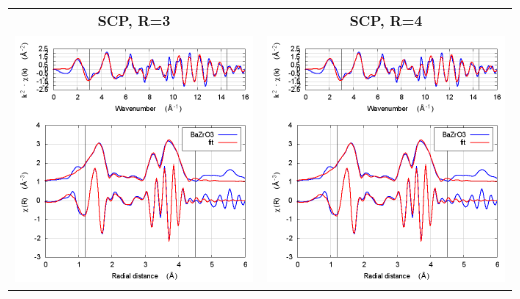 \documentclass[11pt]{article}
\begin{document}
\begin{center}
  \begin{tabular}{cc}
    \textbf{SCP, R=3} & \textbf{SCP, R=4} \\ 
    \includegraphics[width=.45\linewidth]{BaZrO3/scf/fit_withSCF_3.png} & 
    \includegraphics[width=.45\linewidth]{BaZrO3/scf/fit_withSCF_4.png} \\
  \end{tabular}
\end{center}
\end{document}

